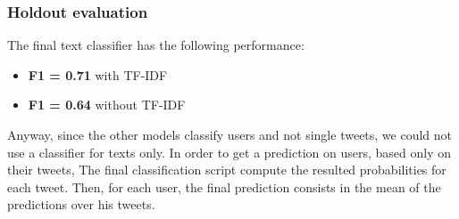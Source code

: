 \subsubsection{Holdout evaluation}
The final text classifier has the following performance:
\begin{itemize}
	\item[\PencilRight] \textbf{F1 = 0.71} with TF-IDF
	\item[\PencilRight] \textbf{F1 = 0.64} without TF-IDF
\end{itemize}

Anyway, since the other models classify users and not single tweets, we could not use a classifier for texts only.
In order to get a prediction on users, based only on their tweets, The final classification script compute the resulted probabilities for each tweet. Then, for each user, the final prediction consists in the mean of the predictions over his tweets.